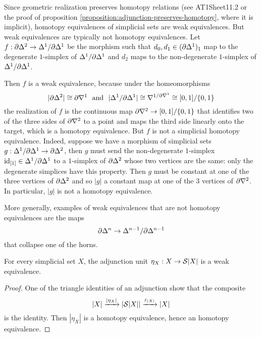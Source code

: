 \begin{examples}
Since geometric realization preserves homotopy relations (see AT1Sheet11.2 or the proof of proposition \ref{proposition:adjunction-preserves-homotopy}, where it is implicit), homotopy equivalences of simplicial sets are weak equivalences. But weak equivalences are typically not homotopy equivalences.
Let $f:\de\Delta^2\to\Delta^1/\de\Delta^1$
be the morphism such that $d_0,d_1\in(\de\Delta^1)_1$ map to the degenerate $1$-simplex of $\Delta^1/\de\Delta^1$ and $d_2$ maps to the non-degenerate $1$-simplex of $\Delta^1/\de\Delta^1$.\alvaropls

Then $f$ is a weak equivalence, because under the homeomorphisms
\[|\de\Delta^2|\cong\de\sx{1}\ \text{ and }\ |\Delta^1/\de\Delta^1|\cong\sx{1/\de\sx{1}}\cong[0,1]/\cb{0,1}\]
the realization of $f$ is the continuous map $\de\sx{2}\to[0,1]/\cb{0,1}$ that identifies two of the three sides of $\de\sx{2}$ to a point and maps the third side linearly onto the target, which is a homotopy equivalence. But $f$ is not a simplicial homotopy equivalence. Indeed, suppose we have a morphism of simplicial sets $g:\Delta^1/\de\Delta^1\to\de\Delta^2$, then $g$ must send the non-degenerate $1$-simplex $\id_{[1]}\in\Delta^1/\de\Delta^1$ to a $1$-simplex of $\de\Delta^2$ whose two vertices are the same: only the degenerate simplices have this property. Then $g$ must be constant at one of the three vertices of $\de\Delta^2$ and so $|g|$ a constant map at one of the $3$ vertices of $\de\sx{2}$. In particular, $|g|$ is not a homotopy equivalence.

More generally, examples of weak equivalences that are not homotopy equivalences are the maps
\[\de\Delta^n\to\Delta^{n-1}/\de\Delta^{n-1}\]
that collapse one of the horns.
\end{examples}

\begin{proposition}\label{proposition:adjunction-unit-is-a-weak-equivalence}
For every simplicial set $X$, the adjunction unit $\eta_X:X\to\S|X|$ is a weak equivalence.
\end{proposition}

\begin{proof}
One of the triangle identities of an adjunction show that the composite
\[|X|\xto{|\eta_X|}|\S|X||\xto{\epsilon_{|X|}}|X|\]
is the identity. Then $|\eta_X|$ is a homotopy equivalence, hence an homotopy equivalence.
\end{proof}

